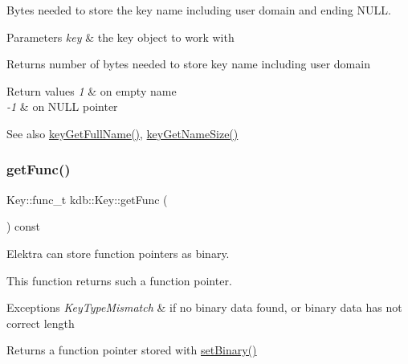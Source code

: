 Bytes needed to store the key name including user domain and ending N\+U\+LL. 


\begin{DoxyParams}{Parameters}
{\em key} & the key object to work with \\
\hline
\end{DoxyParams}
\begin{DoxyReturn}{Returns}
number of bytes needed to store key name including user domain 
\end{DoxyReturn}

\begin{DoxyRetVals}{Return values}
{\em 1} & on empty name \\
\hline
{\em -\/1} & on N\+U\+LL pointer \\
\hline
\end{DoxyRetVals}
\begin{DoxySeeAlso}{See also}
\mbox{\hyperlink{group__keyname_gaaba1494a5ffc976e0e56c43f4334a23c}{key\+Get\+Full\+Name()}}, \mbox{\hyperlink{group__keyname_gabdbcfa51ed8a387e47ead207affa2d2e}{key\+Get\+Name\+Size()}} 
\end{DoxySeeAlso}
\mbox{\label{classkdb_1_1Key_aa9643866a567ba5f012a3e9ab2a91721}} 
\subsubsection{\texorpdfstring{getFunc()}{getFunc()}}
{\footnotesize\ttfamily Key\+::func\+\_\+t kdb\+::\+Key\+::get\+Func (\begin{DoxyParamCaption}{ }\end{DoxyParamCaption}) const\hspace{0.3cm}{\ttfamily [inline]}}



Elektra can store function pointers as binary. 

This function returns such a function pointer.


\begin{DoxyExceptions}{Exceptions}
{\em Key\+Type\+Mismatch} & if no binary data found, or binary data has not correct length\\
\hline
\end{DoxyExceptions}
\begin{DoxyReturn}{Returns}
a function pointer stored with \mbox{\hyperlink{classkdb_1_1Key_af7211129a4b95f4d1e335dcd06e9bf0a}{set\+Binary()}} 
\end{DoxyReturn}
\mbox{\label{classkdb_1_1Key_a6be9b3bb17434fd4362d137183d51100}} 
